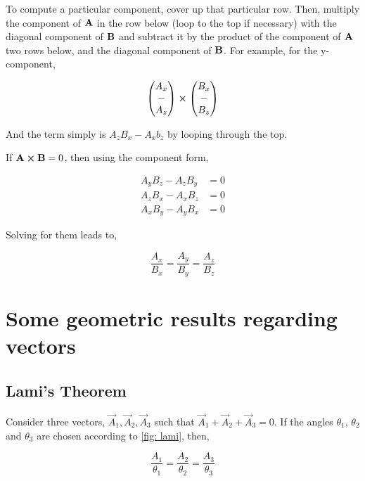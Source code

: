 To compute a particular component, cover up that particular row. Then, multiply the component 
of \(\boldsymbol{\mathbf{A}}\) in the row below (loop to the top if necessary) 
with the diagonal component of \(\boldsymbol{\mathbf{B}}\) and
subtract it by the product of the component of \(\boldsymbol{\mathbf{A}}\) two rows below, and the
diagonal component of \(\boldsymbol{\mathbf{B}}\). For example, for the y-component,

\[
\begin{pmatrix}
    A_x \\
    - \\
    A_z
\end{pmatrix} \cp
%
\begin{pmatrix}
    B_x \\
    - \\
    B_z
\end{pmatrix}
%
\]

And the term simply is \(A_zB_x - A_xb_z\) by looping through the top.

If \(\vec{A} \cp \vec{B} = 0\), then using the component form, 

\begin{align*}
        A_yB_z - A_zB_y &= 0\\
        A_zB_x - A_xB_z &= 0\\
        A_xB_y - A_yB_x &= 0
\end{align*}

Solving for them leads to,

\begin{equation*}
    \frac{A_x}{B_x} = \frac{A_y}{B_y} = \frac{A_z}{B_z}
\end{equation*}

\section{Some geometric results regarding vectors}

\subsection{Lami's Theorem}

Consider three vectors, \(\vec{A}_1, \vec{A}_2, \vec{A}_3\) such that 
\(\vec{A}_1 + \vec{A}_2 + \vec{A}_3 = 0\). If the angles \(\theta_1\), \(\theta_2\)
and \(\theta_3\) are chosen according to \cref{fig: lami}, then,

\begin{theorem}
    \begin{equation*}
        \frac{A_1}{\theta_1} = \frac{A_2}{\theta_2} = \frac{A_3}{\theta_3}
    \end{equation*}
\end{theorem}

